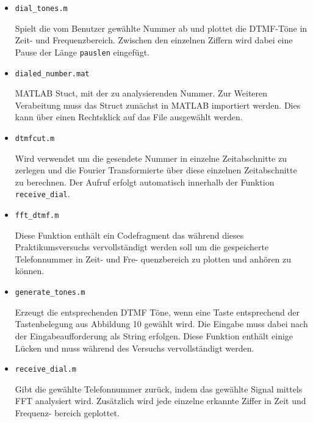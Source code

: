 \documentclass[10pt]{scrreprt}
\begin{document}
        \begin{itemize}
            \item \texttt{dial\_tones.m}

                Spielt die vom Benutzer gewählte Nummer ab und plottet die DTMF-Töne in Zeit-
                und Frequenzbereich. Zwischen den einzelnen Ziffern wird dabei eine Pause der
                Länge \texttt{pauslen} eingefügt.

            \item \texttt{dialed\_number.mat}

                MATLAB Stuct, mit der zu analysierenden Nummer. Zur Weiteren Verabeitung
                muss das Struct zunächst in MATLAB importiert werden. Dies kann über einen
                Rechtsklick auf das File ausgewählt werden.

            \item \texttt{dtmfcut.m}

                Wird verwendet um die gesendete Nummer in einzelne Zeitabschnitte zu zerlegen
                und die Fourier Transformierte über diese einzelnen Zeitabschnitte zu berechnen.
                Der Aufruf erfolgt automatisch innerhalb der Funktion \texttt{receive\_dial}.

            \item \texttt{fft\_dtmf.m}

                Diese Funktion enthält ein Codefragment das während dieses Praktikumsversuchs
                vervollständigt werden soll um die gespeicherte Telefonnummer in Zeit- und Fre-
                quenzbereich zu plotten und anhören zu können.

            \item \texttt{generate\_tones.m}

                Erzeugt die entsprechenden DTMF Töne, wenn eine Taste entsprechend der Tastenbelegung aus Abbildung 10 gewählt wird. Die Eingabe muss dabei nach der
                Eingabeaufforderung als String erfolgen. Diese Funktion enthält einige Lücken und muss während des Versuchs
                vervollständigt werden.

            \item \texttt{receive\_dial.m}

                Gibt die gewählte Telefonnummer zurück, indem das gewählte Signal mittels FFT
                analysiert wird. Zusätzlich wird jede einzelne erkannte Ziffer in Zeit und Frequenz-
                bereich geplottet.
        \end{itemize}
\end{document}
